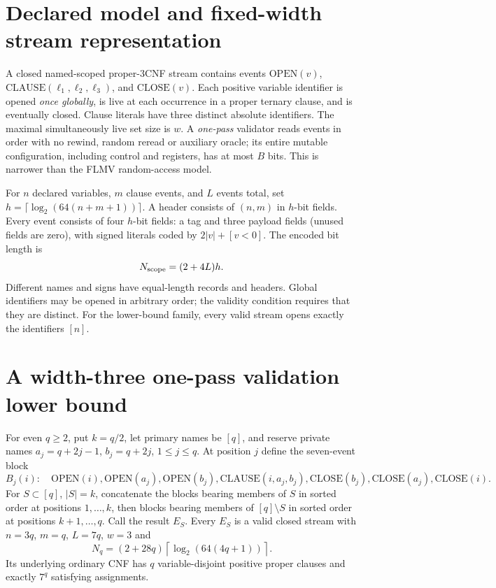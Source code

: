 \documentclass[11pt]{article}
\begin{document}
\section{Declared model and fixed-width stream representation}
A closed named-scoped proper-3CNF stream contains events
$\mathrm{OPEN}(v)$, $\mathrm{CLAUSE}(\ell_1,\ell_2,\ell_3)$, and
$\mathrm{CLOSE}(v)$. Each positive variable identifier is opened
\emph{once globally}, is live at each occurrence in a proper ternary
clause, and is eventually closed. Clause literals have three distinct
absolute identifiers. The maximal simultaneously live set size is $w$.
A \emph{one-pass} validator reads events in order with no rewind,
random reread or auxiliary oracle; its entire mutable configuration,
including control and registers, has at most $B$ bits.
This is narrower than the FLMV random-access model.

For $n$ declared variables, $m$ clause events, and $L$ events total,
set $h=\lceil\log_2(64(n+m+1))\rceil$.
A header consists of $(n,m)$ in $h$-bit fields.
Every event consists of four $h$-bit fields: a tag and three payload
fields (unused fields are zero), with signed literals coded by
$2|v|+[v<0]$. The encoded bit length is
\[
N_{\rm scope}=(2+4L)h.
\]
Different names and signs have equal-length records and headers.
Global identifiers may be opened in arbitrary order; the validity
condition requires that they are distinct. For the lower-bound family,
every valid stream opens exactly the identifiers $[n]$.

\section{A width-three one-pass validation lower bound}
For even $q\ge2$, put $k=q/2$, let primary names be $[q]$,
and reserve private names $a_j=q+2j-1$, $b_j=q+2j$, $1\le j\le q$.
At position $j$ define the seven-event block
\[
B_j(i):\quad
\mathrm{OPEN}(i),\mathrm{OPEN}(a_j),\mathrm{OPEN}(b_j),
\mathrm{CLAUSE}(i,a_j,b_j),
\mathrm{CLOSE}(b_j),\mathrm{CLOSE}(a_j),\mathrm{CLOSE}(i).
\]
For $S\subset[q]$, $|S|=k$, concatenate the blocks bearing
members of $S$ in sorted order at positions $1,\dots,k$,
then blocks bearing members of $[q]\setminus S$ in sorted order at
positions $k+1,\dots,q$. Call the result $E_S$.
Every $E_S$ is a valid closed stream with $n=3q$, $m=q$, $L=7q$,
$w=3$ and
\[
N_q=(2+28q)\left\lceil\log_2(64(4q+1))\right\rceil.
\]
Its underlying ordinary CNF has $q$ variable-disjoint positive proper
clauses and exactly $7^q$ satisfying assignments.
\end{document}
